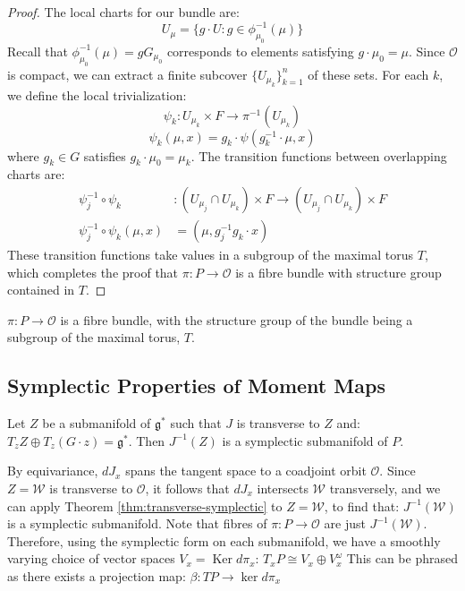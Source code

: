 \begin{proof}
\noindent The local charts for our bundle are:
\begin{equation}
U_{\mu} = \{g \cdot U: g \in \phi_{\mu_0}^{-1}(\mu) \}
\end{equation}
Recall that $\phi_{\mu_0}^{-1}(\mu) = g G_{\mu_0}$ corresponds to elements satisfying $g \cdot \mu_0 = \mu$. Since $\mathcal{O}$ is compact, we can extract a finite subcover $\{U_{\mu_k}\}_{k=1}^n$ of these sets.
For each $k$, we define the local trivialization:
\begin{equation}
\psi_k: U_{\mu_k} \times F \to \pi^{-1}(U_{\mu_k})
\end{equation}
\begin{equation}
\psi_k(\mu, x) = g_k \cdot \psi(g_k^{-1} \cdot \mu, x)
\end{equation}
where $g_k \in G$ satisfies $g_k \cdot \mu_0 = \mu_k$. The transition functions between overlapping charts are:
\begin{align}
\psi_j^{-1} \circ \psi_k&: (U_{\mu_j} \cap U_{\mu_k}) \times F \to (U_{\mu_j} \cap U_{\mu_k}) \times F\\
\psi_j^{-1} \circ \psi_k(\mu, x) &= (\mu, g_j^{-1} g_k \cdot x)
\end{align}
These transition functions take values in a subgroup of the maximal torus $T$, which completes the proof that $\pi: P \to \mathcal{O}$ is a fibre bundle with structure group contained in $T$.
\end{proof}

\begin{theorem} \label{thm:fibre-bundle}
$\pi: P \to \mathcal{O}$ is a fibre bundle, with the structure group of the bundle being a subgroup of the maximal torus, $T$. 
\end{theorem}

\subsection{Symplectic Properties of Moment Maps}
\begin{theorem}\label{thm:transverse-symplectic}
Let $Z$ be a submanifold of $\mathfrak{g}^*$ such that $J$ is transverse to $Z$ and:
$T_{z} Z \oplus T_{z}(G \cdot z) = \mathfrak{g}^* $. Then $J^{-1}(Z)$ is a symplectic submanifold of $P$. 
\end{theorem}

\begin{lemma}
By equivariance, $dJ_{x}$ spans the tangent space to a coadjoint orbit $\mathcal{O}$. Since $Z = \mathcal{W}$ is transverse to $\mathcal{O}$, it follows that $dJ_{x}$ intersects $\mathcal{W}$ transversely, and we can apply Theorem \ref{thm:transverse-symplectic} to $Z = \mathcal{W}$, to find that: $J^{-1}(\mathcal{W})$ is a symplectic submanifold. Note that fibres of $\pi: P \to \mathcal{O}$ are just $J^{-1}(\mathcal{W})$. Therefore, using the symplectic form on each submanifold, we have a smoothly varying choice of vector spaces $V_{x} = \operatorname{Ker} d \pi_{x}$: $T_{x} P \cong V_{x} \oplus V_{x}^{\omega}$
\noindent This can be phrased as there exists a projection map: $\beta: TP \to \ker d\pi_{x} $
  
\end{lemma}

